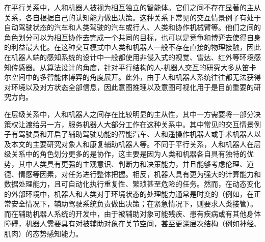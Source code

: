 在平行关系中，人和机器人被视为相互独立的智能体。它们之间不存在显著的主从关系，各自根据自己的认知能力做出决策。这种关系下常见的交互情景例子有处于自动驾驶状态的汽车和人类驾驶的汽车或行人、人类和协作机械臂等。他们之间的角色划分可以为相互协作去完成一个共同的目标，也可以是竞争和博弈去使得自身的利益最大化。在这种交互模式中人类和机器人一般不存在直接的物理接触，因此在机器人端的感知系统的设计中一般都使用非侵入式的视觉、雷达、红外等环境感知传感器。从算法设计的角度，针对平行结构的人-机器人交互的研究大多从笛卡尔空间中的多智能体博弈的角度展开。此外，由于人和机器人系统往往都无法获得对环境以及对方状态全部信息，因此意图推理\cite{fangBehavioralIntentionPrediction2023}以及意图可视化\cite{szafirConnectingHumanRobotInteraction2021}用于是目前重要的研究方向。

在层级关系中，人和机器人之间存在比较明显的主从性，其中一方需要将一部分决策权让渡给另一方，服务机器人大部分工作在这种关系中。其中常见的交互情景例子有驾驶员和开启了辅助驾驶功能的智能汽车、人和遥操作机器人或手术机器人以及本文的主要研究对象人和康复辅助机器人等。不同于平行关系，人和机器人在层级关系中的角色划分更多的是协作，这主要是因为人类和机器各自具有独特的优势，其中人类具有更强的主观意识、判断力和决策能力，并且能够考虑伦理、道德、情感等因素，对任务进行整体把握。相反，机器人具有更为强大的计算能力和数据处理能力，且可自动化执行重复性、繁琐甚至危险的任务。然而，在动态变化的外部环境中，机器人和人类对于环境状态的处理能力通常是时变的（例如，在正常安全情况下，辅助驾驶系统负责做出决策；在紧急情况下，则要求人类接管）。而在辅助机器人系统的开发中，由于被辅助对象可能残疾、患有疾病或有其他身体障碍，机器人需要具有对被辅助对象在关节空间，甚至更深层次结构（例如神经、肌肉）的态势感知能力。

